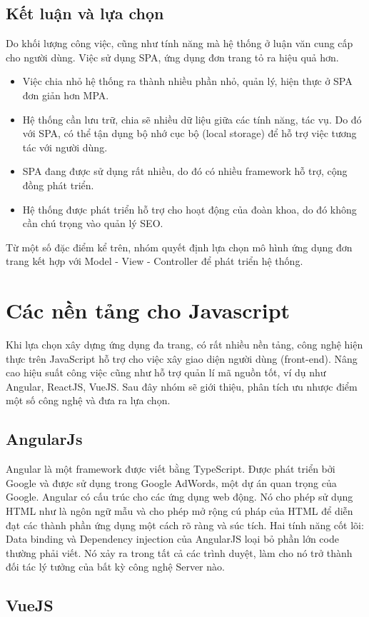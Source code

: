 \subsection{Kết luận và lựa chọn}
Do khối lượng công việc, cũng như tính năng mà hệ thống ở luận văn cung cấp cho người dùng. Việc sử dụng SPA, ứng dụng đơn trang tỏ ra hiệu quả hơn. 
\begin{itemize}
    \item Việc chia nhỏ hệ thống ra thành nhiều phần nhỏ, quản lý, hiện thực ở SPA đơn giản hơn MPA.
    \item Hệ thống cần lưu trữ, chia sẽ nhiều dữ liệu giữa các tính năng, tác vụ. Do đó với SPA, có thể tận dụng bộ nhớ cục bộ (local storage) để hỗ trợ việc tương tác với người dùng.
    \item SPA đang được sử dụng rất nhiều, do đó có nhiều framework hỗ trợ, cộng đồng phát triển.
    \item Hệ thống được phát triển hỗ trợ cho hoạt động của đoàn khoa, do đó không cần chú trọng vào quản lý SEO.
\end{itemize}
Từ một số đặc điểm kể trên, nhóm quyết định lựa chọn mô hình ứng dụng đơn trang kết hợp với Model - View - Controller để phát triển hệ thống.
\section{Các nền tảng cho Javascript}
Khi lựa chọn xây dựng ứng dụng đa trang, có rất nhiều nền tảng, công nghệ hiện thực trên JavaScript hỗ trợ cho việc xây giao diện người dùng (front-end). Nâng cao hiệu suất công việc cũng như hỗ trợ quản lí mã nguồn tốt, ví dụ như Angular, ReactJS, VueJS. Sau đây nhóm sẽ giới thiệu, phân tích ưu nhược điểm một số công nghệ và đưa ra lựa chọn.

\subsection{AngularJs}
Angular là một framework được viết bằng TypeScript. Được phát triển bởi Google và được sử dụng trong Google AdWords, một dự án quan trọng của Google. Angular có cấu trúc cho các ứng dụng web động. Nó cho phép sử dụng HTML như là ngôn ngữ mẫu và cho phép mở rộng cú pháp của HTML để diễn đạt các thành phần ứng dụng một cách rõ ràng và súc tích. Hai tính năng cốt lõi: Data binding và Dependency injection của AngularJS loại bỏ phần lớn code thường phải viết. Nó xảy ra trong tất cả các trình duyệt, làm cho nó trở thành đối tác lý tưởng của bất kỳ công nghệ Server nào.
\subsection{VueJS}


